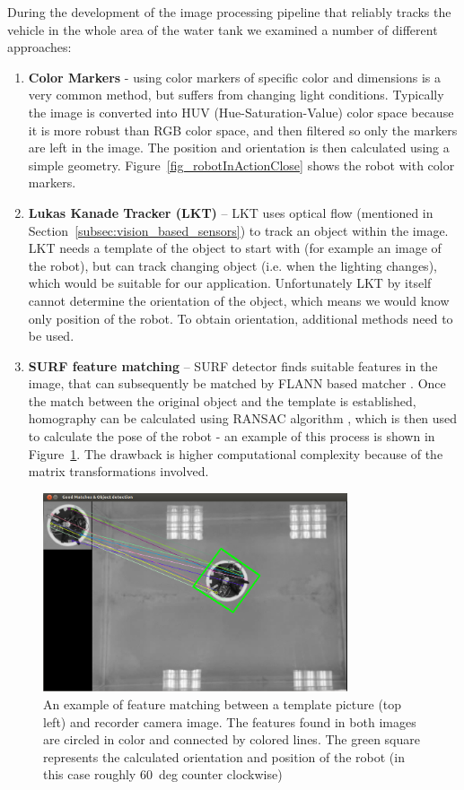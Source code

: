 During the development of the image processing pipeline that reliably tracks the vehicle in the whole area of the water tank we examined a number of different approaches:
\begin{enumerate}
\item \textbf{Color Markers} - using color markers of specific color and dimensions is a very common method, but suffers from changing light conditions. Typically the image is converted into HUV (Hue-Saturation-Value) color space because it is more robust than RGB color space, and then filtered so only the markers are left in the image. The position and orientation is then calculated using a simple geometry. Figure~\ref{fig_robotInActionClose} shows the robot with color markers.
\item \textbf{Lukas Kanade Tracker (LKT)}\cite{Lucas1981} -- LKT uses optical flow (mentioned in Section~\ref{subsec:vision_based_sensors}) to track an object within the image. LKT needs a template of the object to start with (for example an image of the robot), but can track changing object (i.e. when the lighting changes), which would be suitable for our application. Unfortunately LKT by itself cannot determine the orientation of the object, which means we would know only position of the robot. To obtain orientation, additional methods need to be used.
\item \textbf{SURF feature matching} -- SURF detector \cite{Bay2008} finds suitable features in the image, that can subsequently be matched by FLANN based matcher \cite{Muja09fastapproximate}. Once the match between the original object and the template is established, homography can be calculated using RANSAC algorithm \cite{Fischler}, which is then used to calculate the pose of the robot - an example of this process is shown in Figure~\ref{fig:vision_matching}. The drawback is higher computational complexity because of the matrix transformations involved.
\end{enumerate}


\begin{figure}
\centering
\includegraphics[width=0.8\textwidth]{Files/Figures/vision_matching.png}
\caption[Feature matching example]{An example of feature matching between a template picture (top left) and recorder camera image. The features found in both images are circled in color and connected by colored lines. The green square represents the calculated orientation and position of the robot (in this case roughly 60~deg counter clockwise)}
\label{fig:vision_matching}
\end{figure}


